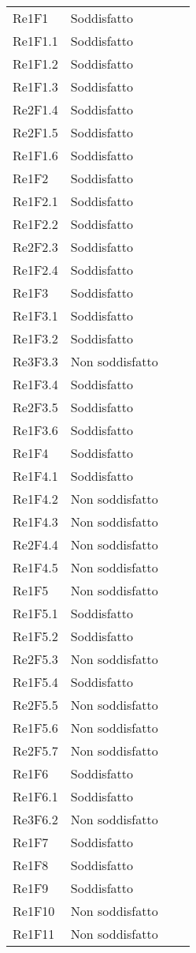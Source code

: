 \begin{longtable}{C{3cm} C{3cm} L{5.5cm} C{3cm}}
Re1F1 & Soddisfatto\\
Re1F1.1 & Soddisfatto\\
Re1F1.2 & Soddisfatto\\
Re1F1.3 & Soddisfatto\\
Re2F1.4 & Soddisfatto\\
Re2F1.5 & Soddisfatto\\
Re1F1.6 & Soddisfatto\\
Re1F2 & Soddisfatto\\
Re1F2.1 & Soddisfatto\\
Re1F2.2 & Soddisfatto\\
Re2F2.3 & Soddisfatto\\
Re1F2.4 & Soddisfatto\\
Re1F3 & Soddisfatto\\
Re1F3.1 & Soddisfatto\\
Re1F3.2 & Soddisfatto\\
Re3F3.3 & Non soddisfatto\\ 
Re1F3.4 & Soddisfatto\\
Re2F3.5 & Soddisfatto\\
Re1F3.6 & Soddisfatto\\
Re1F4 & Soddisfatto\\
Re1F4.1 & Soddisfatto\\
Re1F4.2 & Non soddisfatto\\
Re1F4.3 & Non soddisfatto\\
Re2F4.4 & Non soddisfatto\\
Re1F4.5 & Non soddisfatto\\
Re1F5 & Non soddisfatto\\
Re1F5.1 & Soddisfatto\\
Re1F5.2 & Soddisfatto\\
Re2F5.3 & Non soddisfatto\\
Re1F5.4 & Soddisfatto\\
Re2F5.5 & Non soddisfatto\\
Re1F5.6 & Non soddisfatto\\
Re2F5.7 & Non soddisfatto\\
Re1F6 & Soddisfatto\\
Re1F6.1 & Soddisfatto\\
Re3F6.2 & Non soddisfatto\\
Re1F7 & Soddisfatto\\
Re1F8 & Soddisfatto\\
Re1F9 & Soddisfatto\\
Re1F10 & Non soddisfatto\\
Re1F11 & Non soddisfatto\\

\end{longtable}
